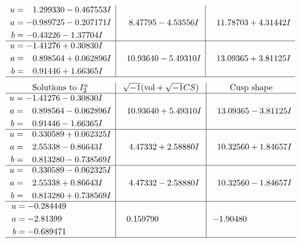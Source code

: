 \documentclass[1p]{elsarticle_modified}
\theoremstyle{definition}
\newcommand{\I}{\sqrt{-1}}
\begin{document}
$$\begin{array}{c|c|c}
\begin{aligned}
u &= \phantom{-}1.299330 - 0.467553 I \\
a &= -0.989725 - 0.207171 I \\
b &= -0.43226 - 1.37704 I\end{aligned}
 & \phantom{-}8.47795 - 4.53556 I & \phantom{-}11.78703 + 4.31442 I \\ \hline\begin{aligned}
u &= -1.41276 + 0.30830 I \\
a &= \phantom{-}0.898564 + 0.062896 I \\
b &= \phantom{-}0.91446 + 1.66365 I\end{aligned}
 & \phantom{-}10.93640 - 5.49310 I & \phantom{-}13.09365 + 3.81125 I\\
 \hline 
 \end{array}$$\newpage$$\begin{array}{c|c|c}  
\text{Solutions to }I^u_{2}& \I (\text{vol} + \sqrt{-1}CS) & \text{Cusp shape}\\
 \hline 
\begin{aligned}
u &= -1.41276 - 0.30830 I \\
a &= \phantom{-}0.898564 - 0.062896 I \\
b &= \phantom{-}0.91446 - 1.66365 I\end{aligned}
 & \phantom{-}10.93640 + 5.49310 I & \phantom{-}13.09365 - 3.81125 I \\ \hline\begin{aligned}
u &= \phantom{-}0.330589 + 0.062325 I \\
a &= \phantom{-}2.55338 - 0.86643 I \\
b &= \phantom{-}0.813280 - 0.738569 I\end{aligned}
 & \phantom{-}4.47332 + 2.58880 I & \phantom{-}10.32560 + 1.84657 I \\ \hline\begin{aligned}
u &= \phantom{-}0.330589 - 0.062325 I \\
a &= \phantom{-}2.55338 + 0.86643 I \\
b &= \phantom{-}0.813280 + 0.738569 I\end{aligned}
 & \phantom{-}4.47332 - 2.58880 I & \phantom{-}10.32560 - 1.84657 I \\ \hline\begin{aligned}
u &= -0.284449\phantom{ +0.000000I} \\
a &= -2.81399\phantom{ +0.000000I} \\
b &= -0.689471\phantom{ +0.000000I}\end{aligned}
 & \phantom{-}0.159790\phantom{ +0.000000I} & -1.90480\phantom{ +0.000000I}\\
 \hline 
 \end{array}$$\newpage
\end{document}
